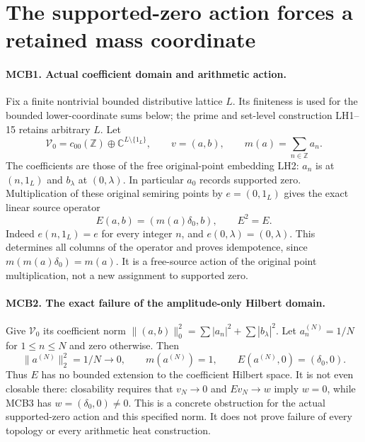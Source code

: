 \section{The supported-zero action forces a retained mass coordinate}
\label{sec:supported-zero-mass-completion}

\paragraph{MCB1. Actual coefficient domain and arithmetic action.}
Fix a finite nontrivial bounded distributive lattice \(L\). Its
finiteness is used for the bounded lower-coordinate sums below;
the prime and set-level construction LH1--15 retains arbitrary
\(L\). Let
\[
 \mathcal V_0=c_{00}(\mathbb Z)\oplus
        \mathbb C^{L\setminus\{1_L\}},\qquad v=(a,b),\qquad
 m(a)=\sum_{n\in\mathbb Z}a_n .                    \tag{MCB1}
\]
The coefficients are those of the free original-point embedding
LH2: \(a_n\) is at \((n,1_L)\) and \(b_\lambda\) at
\((0,\lambda)\). In particular \(a_0\) records supported zero.
Multiplication of these original semiring points by
\(e=(0,1_L)\) gives the exact linear source operator
\[
 E(a,b)=(m(a)\delta_0,b),\qquad E^2=E .            \tag{MCB2}
\]
Indeed \(e(n,1_L)=e\) for every integer \(n\), and
\(e(0,\lambda)=(0,\lambda)\). This determines all columns of
the operator and proves idempotence, since \(m(m(a)\delta_0)=m(a)\).
It is a free-source action of the original point multiplication,
not a new assignment to supported zero.

\paragraph{MCB2. The exact failure of the amplitude-only Hilbert domain.}
Give \(\mathcal V_0\) its coefficient norm
\(\|(a,b)\|_0^2=\sum|a_n|^2+\sum|b_\lambda|^2\).
Let \(a^{(N)}_n=1/N\) for \(1\le n\le N\) and zero otherwise.
Then
\[
 \|a^{(N)}\|_2^2=1/N\longrightarrow0,\qquad
 m(a^{(N)})=1,
 \qquad E(a^{(N)},0)=(\delta_0,0).               \tag{MCB3}
\]
Thus \(E\) has no bounded extension to the coefficient Hilbert
space. It is not even closable there: closability requires that
\(v_N\to0\) and \(Ev_N\to w\) imply \(w=0\), while MCB3
has \(w=(\delta_0,0)\ne0\). This is a concrete obstruction
for the actual supported-zero action and this specified norm.
It does not prove failure of every topology or every arithmetic
heat construction.


